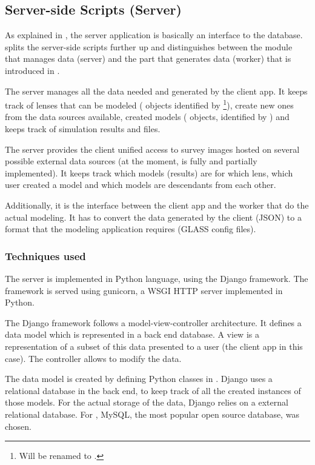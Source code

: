 \subsection{Server-side Scripts (Server)}
\label{sec:server}

As explained in , the server application is basically an interface to the database.
\spl splits the server-side scripts further up and distinguishes between the module that manages data (server) and the part that generates data (worker) that is introduced in .

The server manages all the data needed and generated by the client app.
It keeps track of lenses that can be modeled ( objects identified by \footnote{Will be renamed to .}), create new ones from the data sources available, created models ( objects, identified by ) and keeps track of simulation results and files.

The server provides the client unified access to survey images hosted on several possible external data sources (at the moment, \sw is fully and \ml partially implemented).
It keeps track which models (results) are for which lens, which user created a model and which models are descendants from each other.

Additionally, it is the interface between the client app and the worker that do the actual modeling.
It has to convert the data generated by the client (JSON) to a format that the modeling application requires (GLASS config files).


\subsubsection{Techniques used}

The server is implemented in Python language, using the Django framework.
The framework is served using gunicorn, a WSGI HTTP server implemented in Python.

The Django framework follows a model-view-controller architecture.
It defines a data model which is represented in a back end database.
A view is a representation of a subset of this data presented to a user (the client app in this case).
The controller allows to modify the data.

The data model is created by defining Python classes in .
Django uses a relational database in the back end, to keep track of all the created instances of those models.
For the actual storage of the data, Django relies on a external relational database.
For \spl, MySQL, the most popular\cite{dbranking} open source database, was chosen.

